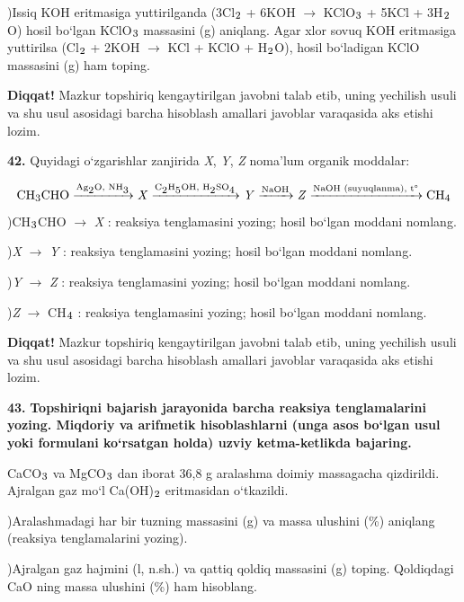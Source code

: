 \documentclass[11pt,a4paper]{article}
\renewcommand{\textsubscript}[1]{\ensuremath{_{\text{\fontsize{8}{8}\selectfont #1}}}}
\newcommand{\diqqat}[1]{\par\smallskip\noindent\textbf{Diqqat!} #1\par\medskip}
\begin{document}
)Issiq KOH eritmasiga yuttirilganda (3Cl\textsubscript{2} + 6KOH $\to$ KClO\textsubscript{3} + 5KCl + 3H\textsubscript{2}O) hosil bo`lgan KClO\textsubscript{3} massasini (g) aniqlang. Agar xlor sovuq KOH eritmasiga yuttirilsa (Cl\textsubscript{2} + 2KOH $\to$ KCl + KClO + H\textsubscript{2}O), hosil bo`ladigan KClO massasini (g) ham toping.\par
\diqqat{Mazkur topshiriq kengaytirilgan javobni talab etib, uning yechilish usuli va shu usul asosidagi barcha hisoblash amallari javoblar varaqasida aks etishi lozim.}
\noindent\textbf{42.} Quyidagi o`zgarishlar zanjirida \textit{X}, \textit{Y}, \textit{Z} noma'lum organik moddalar:\par
\[\setlength{\fboxsep}{0pt}\text{CH\textsubscript{3}CHO}\xrightarrow{\text{Ag\textsubscript{2}O, NH\textsubscript{3}}}\text{\textit{X}}\xrightarrow{\text{C\textsubscript{2}H\textsubscript{5}OH, H\textsubscript{2}SO\textsubscript{4}}}\text{\textit{Y}}\xrightarrow{\text{NaOH}}\text{\textit{Z}}\xrightarrow{\text{NaOH (suyuqlanma), t\textdegree{}}}\text{CH\textsubscript{4}}\]
)CH\textsubscript{3}CHO $\to$ \textit{X} : reaksiya tenglamasini yozing; hosil bo`lgan moddani nomlang.\par
{})\textit{X} $\to$ \textit{Y} : reaksiya tenglamasini yozing; hosil bo`lgan moddani nomlang.\par
{})\textit{Y} $\to$ \textit{Z} : reaksiya tenglamasini yozing; hosil bo`lgan moddani nomlang.\par
{})\textit{Z} $\to$ CH\textsubscript{4} : reaksiya tenglamasini yozing; hosil bo`lgan moddani nomlang.\par
\diqqat{Mazkur topshiriq kengaytirilgan javobni talab etib, uning yechilish usuli va shu usul asosidagi barcha hisoblash amallari javoblar varaqasida aks etishi lozim.}
\noindent\textbf{43.} \textbf{Topshiriqni bajarish jarayonida barcha reaksiya tenglamalarini yozing. Miqdoriy va arifmetik hisoblashlarni (unga asos bo`lgan usul yoki formulani ko`rsatgan holda) uzviy ketma-ketlikda bajaring.}\par\smallskip
CaCO\textsubscript{3} va MgCO\textsubscript{3} dan iborat 36,8 g aralashma doimiy massagacha qizdirildi. Ajralgan gaz mo`l Ca(OH)\textsubscript{2} eritmasidan o`tkazildi.\par
{})Aralashmadagi har bir tuzning massasini (g) va massa ulushini (\%) aniqlang (reaksiya tenglamalarini yozing).\par
{})Ajralgan gaz hajmini (l, n.sh.) va qattiq qoldiq massasini (g) toping. Qoldiqdagi CaO ning massa ulushini (\%) ham hisoblang.\par
\end{document}
